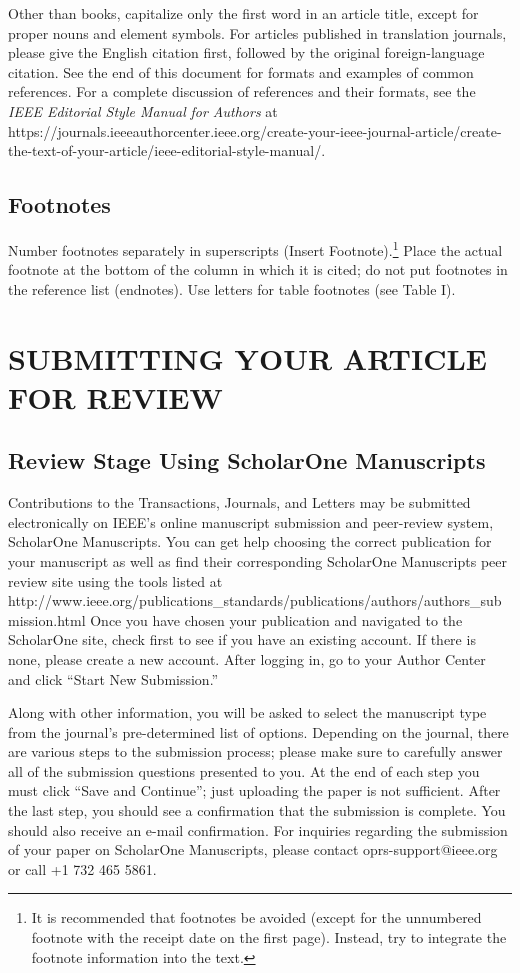 \documentclass[correspondence]{IEEEtaes}
\begin{document}
Other than books, capitalize only the first word in an article title, except for proper nouns and element symbols. For articles published in translation journals, please give the English citation first, followed by the original foreign-language citation. See the end of this document for formats and examples of common references. For a complete discussion of references and their formats, see the \emph{IEEE Editorial Style Manual} \emph{for Authors} at {{https://journals.ieeeauthorcenter.ieee.org/create-your-ieee-journal-article/create-the-text-of-your-article/ieee-editorial-style-manual/}}.

\subsection{Footnotes}

Number footnotes separately in superscripts (Insert \textbar{}Footnote).\footnote{It is recommended that footnotes be avoided (except for the unnumbered footnote with the receipt date on the first page). Instead, try to integrate the footnote information into the text.} Place the actual footnote at the bottom of the column in which it is cited; do not put footnotes in the reference list (endnotes). Use letters for table footnotes (see Table I).

\section{SUBMITTING YOUR ARTICLE FOR REVIEW}

\subsection{Review Stage Using ScholarOne Manuscripts}

Contributions to the Transactions, Journals, and Letters may be submitted electronically on IEEE's online manuscript submission and peer-review system, ScholarOne Manuscripts. You can get help choosing the correct publication for your manuscript as well as find their corresponding ScholarOne Manuscripts peer review site using the tools listed at {{http://www.ieee.org/publications\_standards/\break publications/authors/authors\_submission.html}} Once you have chosen your publication and navigated to the ScholarOne site, check first to see if you have an existing account. If there is none, please create a new account. After logging in, go to your Author Center and click ``Start New Submission.''

Along with other information, you will be asked to select the manuscript type from the journal's pre-determined list of options. Depending on the journal, there are various steps to the submission process; please make sure to carefully answer all of the submission questions presented to you. At the end of each step you must click ``Save and Continue''; just uploading the paper is not sufficient. After the last step, you should see a confirmation that the submission is complete. You should also receive an e-mail confirmation. For inquiries regarding the submission of your paper on ScholarOne Manuscripts, please contact oprs-support@ieee.org or call +1 732 465 5861.
\end{document}
